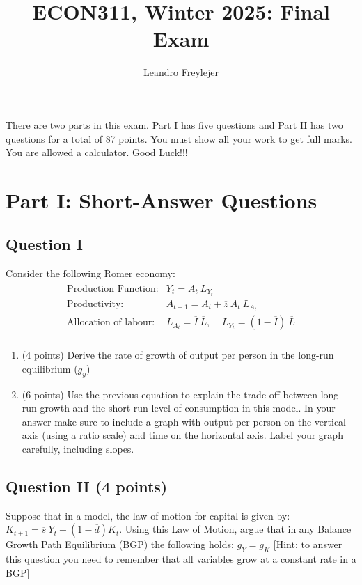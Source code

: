 \documentclass[letterpaper,12pt]{article}
\title{\vspace{-1in}ECON311, Winter 2025: Final Exam}
\author{Leandro Freylejer}
\date{}
\theoremstyle{dotlessS}
\begin{document}
\maketitle
\noindent There are two parts in this exam. Part I has five questions and Part II has two questions for a total of 87 points. You must show all your work to get full marks. You are allowed a calculator. Good Luck!!!
\section{Part I: Short-Answer Questions}

\subsection*{Question I}
Consider the following Romer economy: 
\begin{eqnarray*}
\begin{array}{ll}
\text{Production Function:} & Y_t=A_t  \: L_{Y_t} \\[1.4ex]
\text{Productivity:} & A_{t+1}=A_t+\overline{z} \: A_t \: L_{A_{t}}  \\[1.4ex]
\text{Allocation of labour:} & L_{A_{t}}=\overline{I} \: \overline{L}, \: \: \:  \: \: L_{Y_{t}}=(1-\overline{I}) \: \overline{L}  \\[1.4ex]
\end{array}
\end{eqnarray*}
\begin{enumerate}[label=(\alph*)]
\item (4 points) Derive the rate of growth of output per person in the long-run equilibrium ($g_y$)
\item (6 points) Use the previous equation to explain the trade-off between long-run growth and the short-run level of consumption in this model. In your answer make sure to include a graph with output per person on the vertical axis (using a ratio scale) and time on the horizontal axis. Label your graph carefully, including slopes.
\end{enumerate} 

\subsection*{Question II (4 points)}
Suppose that in a model, the law of motion for capital is given by: $K_{t+1}=\overline{s} \: Y_t+(1-\overline{d})K_{t}$. Using this Law of Motion, argue that in any Balance Growth Path Equilibrium (BGP) the following holds: $g_Y=g_K$ [Hint: to answer this question you need to remember that all variables grow at a constant rate in a BGP]
\end{document}
